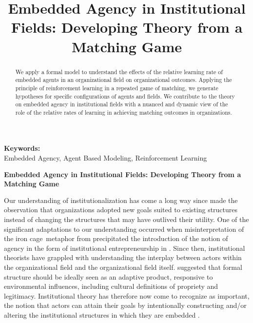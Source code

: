 \documentclass[12pt,letterpaper]{article}
\begin{document}
\title{Embedded Agency in Institutional Fields: Developing Theory from a Matching Game}

\maketitle

\begin{abstract}
\normalsize
We apply a formal model to understand the effects of the relative learning rate of embedded agents in an organizational field on organizational outcomes. Applying the principle of reinforcement learning in a repeated game of matching, we generate hypotheses for specific configurations of agents and fields. We contribute to the theory on embedded agency in institutional fields with a nuanced and dynamic view of the role of the relative rates of learning in achieving matching outcomes in organizations.
\end{abstract}


{\textbf{Keywords:} \\\indent Embedded Agency, Agent Based Modeling, Reinforcement Learning}

\newpage
\pagestyle{fancy}
\fancyhf{}
\cfoot{\thepage}
\begin{center}
\textbf{Embedded Agency in Institutional Fields: Developing Theory from a Matching Game}
\end{center}
\indent Our understanding of  institutionalization has come a long way since \cite{Selznick1957} made the observation that organizations adopted new goals suited to existing structures  instead of changing the structures that may have outlived their utility. One of the significant adaptations to our understanding occurred when misinterpretation of the \textquotesingle iron cage\textquotesingle \ metaphor from  \cite{Dimaggio1983} precipitated the introduction of the notion of agency in the form of institutional entrepreneurship in \cite{Dimaggio1988}. Since then, institutional theorists have grappled with understanding the interplay between  actors within the organizational field and the organizational field itself.  \cite{Selznick1996} suggested that formal structure should be ideally seen as an adaptive product, responsive to environmental influences, including cultural definitions of propriety and legitimacy. Institutional theory has therefore now come to recognize as important, the notion that actors can attain their goals by intentionally constructing and/or altering the institutional structures in which they are embedded \citep{Philips2009}. 
\end{document}

